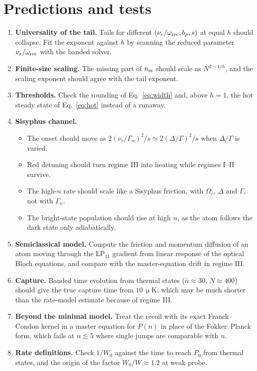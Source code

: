 \documentclass[11pt,a4paper]{article}
\newcommand{\Om}{\Omega}
\newcommand{\nur}{\nu_r}
\newcommand{\micro}{\upmu}
\newcommand{\SI}[2]{\ensuremath{#1\,\mathrm{#2}}}
\begin{document}
\section{Predictions and tests}
\begin{enumerate}
\item \textbf{Universality of the tail.} Tails for different $(\nur/\omega_{\rm rec},b_p,s)$ at equal $h$ should collapse. Fit the exponent against $h$ by scanning the reduced parameter $\nur/\omega_{\rm rec}$ with the banded solver.
\item \textbf{Finite-size scaling.} The missing part of $n_{\rm ss}$ should scale as $N^{2-1/h}$, and the scaling exponent should agree with the tail exponent.
\item \textbf{Thresholds.} Check the rounding of Eq.~\eqref{eq:width} and, above $h=1$, the hot steady state of Eq.~\eqref{eq:hot} instead of a runaway.
\item \textbf{Sisyphus channel.}
\begin{itemize}
\item The onset should move as $2(\nur/\Gamma_n)^2/s\simeq2(\Delta/\Gamma)^2/s$ when $\Delta/\Gamma$ is varied.
\item Red detuning should turn regime III into heating while regimes I--II survive.
\item The high-$n$ rate should scale like a Sisyphus friction, with $\Om_c$, $\Delta$ and $\Gamma$, not with $\Gamma_n$.
\item The bright-state population should rise at high $n$, as the atom follows the dark state only adiabatically.
\end{itemize}
\item \textbf{Semiclassical model.} Compute the friction and momentum diffusion of an atom moving through the LP$_{11}$ gradient from linear response of the optical Bloch equations, and compare with the master-equation drift in regime III.
\item \textbf{Capture.} Banded time evolution from thermal states ($\bar n\approx30$, $N\approx400$) should give the true capture time from \SI{10}{\micro K}, which may be much shorter than the rate-model estimate because of regime III.
\item \textbf{Beyond the minimal model.} Treat the recoil with its exact Franck--Condon kernel in a master equation for $P(n)$ in place of the Fokker--Planck form, which fails at $n\lesssim5$ where single jumps are comparable with $n$.
\item \textbf{Rate definitions.} Check $1/W_0$ against the time to reach $P_0$ from thermal states, and the origin of the factor $W_0/W\approx1.2$ at weak probe.
\end{enumerate}
\end{document}
